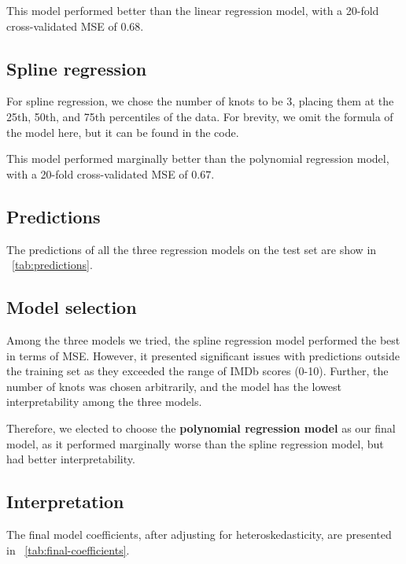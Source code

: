 \documentclass[12pt,a4paper]{article}
\begin{document}
This model performed better than the linear regression model, with a 20-fold cross-validated MSE of $0.68$.

\subsection{Spline regression}\label{subsec:spline-regression}
For spline regression, we chose the number of knots to be 3, placing them at the 25th, 50th, and 75th percentiles of the data.
For brevity, we omit the formula of the model here, but it can be found in the code.

This model performed marginally better than the polynomial regression model, with a 20-fold cross-validated MSE of $0.67$.

\subsection{Predictions}\label{subsec:predictions}
The predictions of all the three regression models on the test set are show in \tablename~\ref{tab:predictions}.

\subsection{Model selection}\label{subsec:model-selection}
Among the three models we tried, the spline regression model performed the best in terms of MSE.
However, it presented significant issues with predictions outside the training set as they exceeded the range of IMDb scores (0-10).
Further, the number of knots was chosen arbitrarily, and the model has the lowest interpretability among the three models.

Therefore, we elected to choose the \textbf{polynomial regression model} as our final model, as it performed marginally worse than the spline regression model, but had better interpretability.

\subsection{Interpretation}\label{subsec:interpretation}
The final model coefficients, after adjusting for heteroskedasticity, are presented in \tablename~\ref{tab:final-coefficients}.
\end{document}
